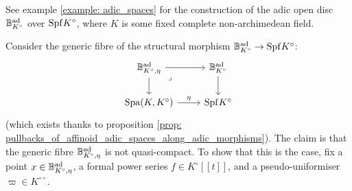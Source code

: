             \begin{example}
                See example \ref{example: adic_spaces} for the construction of the adic open disc $\mathbb{B}^{\mathrm{ad}}_{K^{\circ}}$ over $\mathrm{Spf} K^{\circ}$, where $K$ is some fixed complete non-archimedean field.
            
                Consider the generic fibre of the structural morphism $\mathbb{B}^{\mathrm{ad}}_{K^{\circ}} \to \mathrm{Spf} K^{\circ}$:
                    $$
                        \begin{tikzcd}
                        	{\B^{\ad}_{K^{\circ}, \eta}} & {\B^{\ad}_{K^{\circ}}} \\
                        	{\Spa(K, K^{\circ})} & {\Spf K^{\circ}}
                        	\arrow["\eta", from=2-1, to=2-2]
                        	\arrow[from=1-1, to=2-1]
                        	\arrow[from=1-1, to=1-2]
                        	\arrow["\lrcorner"{anchor=center, pos=0.125}, draw=none, from=1-1, to=2-2]
                        	\arrow[from=1-2, to=2-2]
                        \end{tikzcd}
                    $$
                (which exists thanks to proposition \ref{prop: pullbacks_of_affinoid_adic_spaces_along_adic_morphisms}). The claim is that the generic fibre $\mathbb{B}^{\mathrm{ad}}_{K^{\circ}, \eta}$ is not quasi-compact. To show that this is the case, fix a point $x \in \mathbb{B}^{\mathrm{ad}}_{K^{\circ}, \eta}$, a formal power series $f \in K^{\circ}[\![t]\!]$, and a pseudo-uniformiser $\varpi \in K^{\circ \circ}$.
            \end{example}
            
            \begin{remark} \label{remark: finite_pullbacks_along_non_adic_morphisms}
                
            \end{remark}
            
            \begin{remark} \label{remark: finite_pullbacks_of_non_affinoids}
                
            \end{remark}
            
